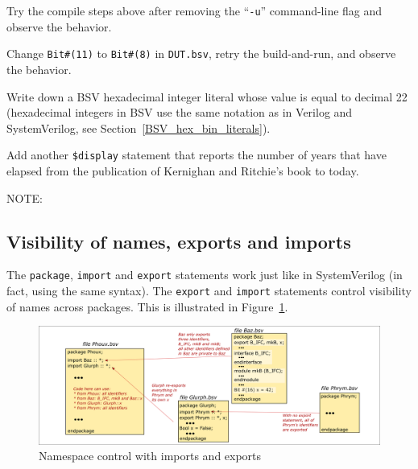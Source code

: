 \Exercise

Try the compile steps above after removing the ``\verb|-u|''
command-line flag and observe the behavior.

\Exercise

Change \verb|Bit#(11)| to \verb|Bit#(8)| in \verb|DUT.bsv|, retry the
build-and-run, and observe the behavior.

\Exercise

Write down a BSV hexadecimal integer literal whose value is equal to
decimal 22 (hexadecimal integers in BSV use the same notation as in
Verilog and SystemVerilog, see Section~\ref{BSV_hex_bin_literals}).

\Exercise

Add another \verb|$display| statement that reports the number of years
that have elapsed from the publication of Kernighan and Ritchie's book
to today.

\Endexercise

\vspace{2ex}

NOTE:


\subsection{Visibility of names, exports and imports}

The \verb|package|, \verb|import| and \verb|export| statements work
just like in SystemVerilog (in fact, using the same syntax).  The
\verb|export| and \verb|import| statements control visibility of names
across packages.  This is illustrated in Figure~\ref{Fig_BSV_namespace_control}.
\begin{figure}[htbp]
  \centerline{\includegraphics[width=6in,angle=0]{Figures/Fig_BSV_namespace_control}}
  \caption{\label{Fig_BSV_namespace_control}
           Namespace control with imports and exports}
\end{figure}

